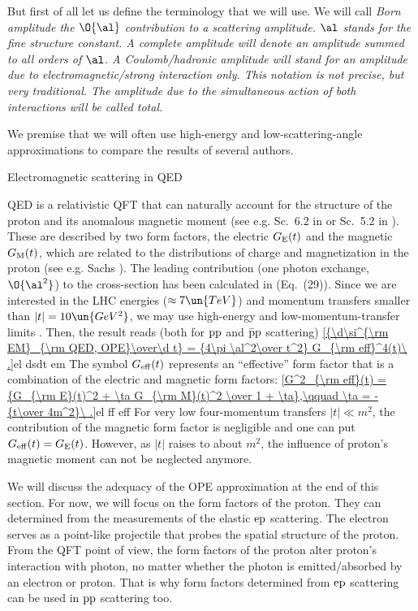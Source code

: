 But first of all let us define the terminology that we will use. We will call \em{Born amplitude} the $\O{\al}$ contribution to a scattering amplitude. $\al$ stands for the fine structure constant. A \em{complete} amplitude will denote an amplitude summed to all orders of $\al$. A \em{Coulomb}/\em{hadronic} amplitude will stand for an amplitude due to electromagnetic/strong interaction only. This notation is not precise, but very traditional. The amplitude due to the simultaneous action of both interactions will be called \em{total}.

We premise that we will often use high-energy and low-scattering-angle approximations to compare the results of several authors.

\caption{Electromagnetic scattering in QED}

QED is a relativistic QFT that can naturally account for the structure of the proton and its anomalous magnetic moment (see e.g. Sc.~6.2 in  or Sc.~5.2 in ). These are described by two form factors, the electric $G_{\rm E}(t)$ and the magnetic $G_{\rm M}(t)$, which are related to the distributions of charge and magnetization in the proton (see e.g. Sachs ). The leading contribution (one photon exchange, $\O{\al^2}$) to the cross-section has been calculated in  (Eq.~(29)). Since we are interested in the LHC energies ($\approx 7\un{TeV}$) and momentum transfers smaller than $|t| = 10\un{GeV^2}$, we may use high-energy and low-momentum-transfer limits . Then, the result reads (both for $\rm pp$ and $\rm \bar p p$ scattering)
\eqref{{\d\si^{\rm EM}_{\rm QED, OPE}\over\d t} = {4\pi \al^2\over t^2} G_{\rm eff}^4(t)\ .}{el dsdt em}
The symbol $G_{\rm eff}(t)$ represents an ``effective'' form factor that is a combination of the electric and magnetic form factors:
\eqref{G^2_{\rm eff}(t) = {G_{\rm E}(t)^2 + \ta G_{\rm M}(t)^2 \over 1 + \ta},\qquad \ta = - {t\over 4m^2}\ .}{el ff eff}
For very low four-momentum transfers $|t| \ll m^2$, the contribution of the magnetic form factor is negligible and one can put $G_{\rm eff}(t) = G_{\rm E}(t)$. However, as $|t|$ raises to about $m^2$, the influence of proton's magnetic moment can not be neglected anymore.

We will discuss the adequacy of the OPE approximation at the end of this section. For now, we will focus on the form factors of the proton. They can determined from the measurements of the elastic $\rm ep$ scattering. The electron serves as a point-like projectile that probes the spatial structure of the proton. From the QFT point of view, the form factors of the proton alter proton's interaction with photon, no matter whether the photon is emitted/absorbed by an electron or proton. That is why form factors determined from $\rm ep$ scattering can be used in $\rm pp$ scattering too.

